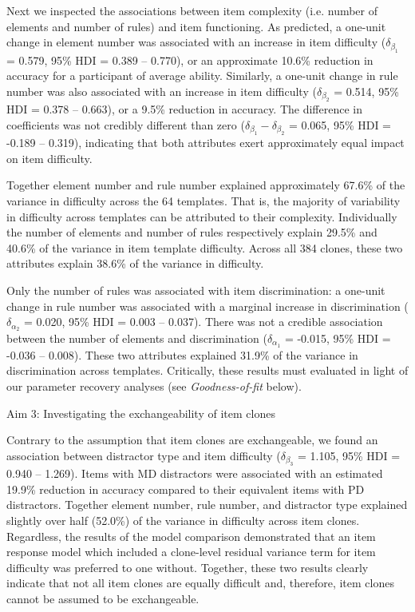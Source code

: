 \documentclass[a4paper,man,natbib]{apa6}
\makeatletter
\renewcommand{\subsubsection}{\@startsection{subsubsection}{3}
  {\z@}%
  {\b@level@two@skip}{\e@level@two@skip}%
  {\normalfont\normalsize\bfseries}}
\makeatother
\begin{document}
Next we inspected the associations between item complexity (i.e. number of elements and number of rules) and item functioning. As predicted, a one-unit change in element number was associated with an increase in item difficulty ($\delta_{\beta_1}$ = 0.579, 95\% HDI = 0.389 -- 0.770), or an approximate 10.6\% reduction in accuracy for a participant of average ability. Similarly, a one-unit change in rule number was also associated with an increase in item difficulty ($\delta_{\beta_2}$ = 0.514, 95\% HDI = 0.378 -- 0.663), or a 9.5\% reduction in accuracy. The difference in coefficients was not credibly different than zero ($\delta_{\beta_1} - \delta_{\beta_2}$ = 0.065, 95\% HDI = -0.189 -- 0.319), indicating that both attributes exert approximately equal impact on item difficulty.

Together element number and rule number explained approximately 67.6\% of the variance in difficulty across the 64 templates. That is, the majority of variability in difficulty across templates can be attributed to their complexity. Individually the number of elements and number of rules respectively explain 29.5\% and 40.6\% of the variance in item template difficulty. Across all 384 clones, these two attributes explain 38.6\% of the variance in difficulty.

Only the number of rules was associated with item discrimination: a one-unit change in rule number was associated with a marginal increase in discrimination ($\delta_{\alpha_2}$ = 0.020, 95\% HDI = 0.003 -- 0.037). There was not a credible association between the number of elements and discrimination ($\delta_{\alpha_1}$ = -0.015, 95\% HDI = -0.036 -- 0.008). These two attributes explained 31.9\% of the variance in discrimination across templates. Critically, these results must evaluated in light of our parameter recovery analyses (see \textit{Goodness-of-fit} below).

\subsubsection{Aim 3: Investigating the exchangeability of item clones}

Contrary to the assumption that item clones are exchangeable, we found an association between distractor type and item difficulty ($\delta_{\beta_3}$ = 1.105, 95\% HDI = 0.940 -- 1.269). Items with MD distractors were associated with an estimated 19.9\% reduction in accuracy compared to their equivalent items with PD distractors. Together element number, rule number, and distractor type explained slightly over half (52.0\%) of the variance in difficulty across item clones. Regardless, the results of the model comparison demonstrated that an item response model which included a clone-level residual variance term for item difficulty was preferred to one without. Together, these two results clearly indicate that not all item clones are equally difficult and, therefore, item clones cannot be assumed to be exchangeable. 
\end{document}
